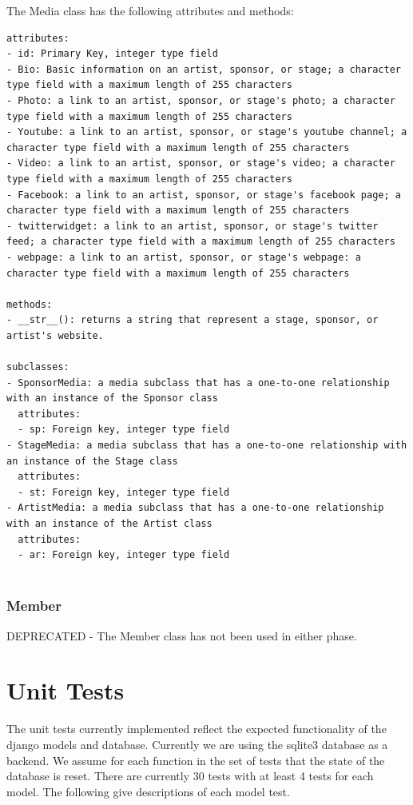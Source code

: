 \documentclass[12pt,english]{scrartcl}
\begin{document}
The Media class has the following attributes and methods:
\begin{verbatim}
attributes:
- id: Primary Key, integer type field
- Bio: Basic information on an artist, sponsor, or stage; a character type field with a maximum length of 255 characters
- Photo: a link to an artist, sponsor, or stage's photo; a character type field with a maximum length of 255 characters
- Youtube: a link to an artist, sponsor, or stage's youtube channel; a character type field with a maximum length of 255 characters
- Video: a link to an artist, sponsor, or stage's video; a character type field with a maximum length of 255 characters
- Facebook: a link to an artist, sponsor, or stage's facebook page; a character type field with a maximum length of 255 characters
- twitterwidget: a link to an artist, sponsor, or stage's twitter feed; a character type field with a maximum length of 255 characters
- webpage: a link to an artist, sponsor, or stage's webpage: a character type field with a maximum length of 255 characters

methods:
- __str__(): returns a string that represent a stage, sponsor, or artist's website.

subclasses:
- SponsorMedia: a media subclass that has a one-to-one relationship with an instance of the Sponsor class
  attributes:
  - sp: Foreign key, integer type field
- StageMedia: a media subclass that has a one-to-one relationship with an instance of the Stage class
  attributes:
  - st: Foreign key, integer type field
- ArtistMedia: a media subclass that has a one-to-one relationship with an instance of the Artist class
  attributes:
  - ar: Foreign key, integer type field
  

\end{verbatim}


\subsubsection{Member}
DEPRECATED - The Member class has not been used in either phase.

\section{Unit Tests}
The unit tests currently implemented reflect the expected functionality of the django models and database.
Currently we are using the sqlite3 database as a backend. We assume for each function in the set of tests that the state of the database is reset.
There are currently 30 tests with at least 4 tests for each model. The following give descriptions of each model test. 
\end{document}
